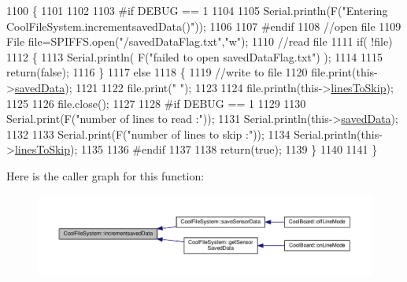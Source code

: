 \begin{DoxyCode}
1100 \{
1101 
1102 
1103 \textcolor{preprocessor}{#if DEBUG == 1}
1104     
1105     Serial.println(F(\textcolor{stringliteral}{"Entering CoolFileSystem.incrementsavedData()"}));  
1106     
1107 \textcolor{preprocessor}{#endif}
1108     \textcolor{comment}{//open file}
1109     File file=SPIFFS.open(\textcolor{stringliteral}{"/savedDataFlag.txt"},\textcolor{stringliteral}{"w"});    
1110     \textcolor{comment}{//read file}
1111     \textcolor{keywordflow}{if}( !file)  
1112     \{
1113         Serial.println( F(\textcolor{stringliteral}{"failed to open savedDataFlag.txt"}) );
1114         
1115         \textcolor{keywordflow}{return}(\textcolor{keyword}{false});      
1116     \}
1117     \textcolor{keywordflow}{else}
1118     \{       
1119         \textcolor{comment}{//write to file }
1120         file.print(this->\hyperlink{class_cool_file_system_ad9f5b739a32100f5f21270c3d9ee2b1d}{savedData});
1121         
1122         file.print(\textcolor{stringliteral}{" "});
1123         
1124         file.println(this->\hyperlink{class_cool_file_system_a84fdb6057e534b395512463daa28ea3c}{linesToSkip});
1125     
1126         file.close();
1127 
1128 \textcolor{preprocessor}{    #if DEBUG == 1}
1129 
1130         Serial.print(F(\textcolor{stringliteral}{"number of lines to read :"}));
1131         Serial.println(this->\hyperlink{class_cool_file_system_ad9f5b739a32100f5f21270c3d9ee2b1d}{savedData});
1132     
1133         Serial.print(F(\textcolor{stringliteral}{"number of lines to skip :"}));
1134         Serial.println(this->\hyperlink{class_cool_file_system_a84fdb6057e534b395512463daa28ea3c}{linesToSkip});
1135 
1136 \textcolor{preprocessor}{    #endif}
1137         
1138         \textcolor{keywordflow}{return}(\textcolor{keyword}{true});
1139     \}
1140     
1141 \}
\end{DoxyCode}
Here is the caller graph for this function\+:
\nopagebreak
\begin{figure}[H]
\begin{center}
\leavevmode
\includegraphics[width=350pt]{db/d0c/class_cool_file_system_aae045125288f255f3e258073dcada2a6_icgraph}
\end{center}
\end{figure}
\mbox{\label{class_cool_file_system_ac86a40e7c3a1842f7342f698d34324f9}} 

